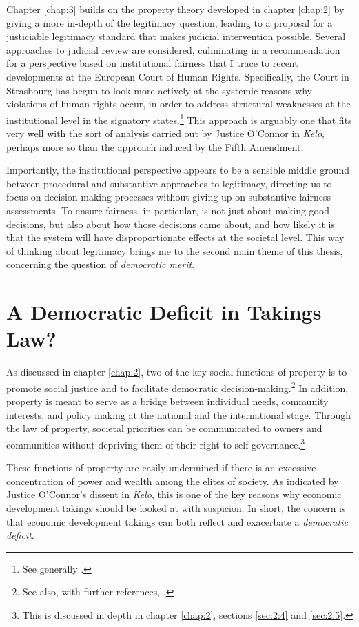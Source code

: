 Chapter \ref{chap:3} builds on the property theory developed in chapter \ref{chap:2} by giving a more in-depth of the legitimacy question, leading to a proposal for a justiciable legitimacy standard that makes judicial intervention possible. Several approaches to judicial review are considered, culminating in a recommendation for a perspective based on institutional fairness that I trace to recent developments at the European Court of Human Rights. Specifically, the Court in Strasbourg has begun to look more actively at the systemic reasons why violations of human rights occur, in order to address structural weaknesses at the institutional level in the signatory states.\footnote{See generally \cite{leach10}.} This approach is arguably one that fits very well with the sort of analysis carried out by Justice O'Connor in {\it Kelo}, perhaps more so than the approach induced by the Fifth Amendment.

Importantly, the institutional perspective appears to be a sensible middle ground between procedural and substantive approaches to legitimacy, directing us to focus on decision-making processes without giving up on substantive fairness assessments. To ensure fairness, in particular, is not just about making good decisions, but also about how those decisions came about, and how likely it is that the system will have disproportionate effects at the societal level. This way of thinking about legitimacy brings me to the second main theme of this thesis, concerning the question of {\it democratic merit}.

\section{A Democratic Deficit in Takings Law?}\label{sec:1:2}

As discussed in chapter \ref{chap:2}, two of the key social functions of property is to promote social justice and to facilitate democratic decision-making.\footnote{See also, with further references, \cite{rose96,jackson10}.} In addition, property is meant to serve as a bridge between individual needs, community interests, and policy making at the national and the international stage. Through the law of property, societal priorities can be communicated to owners and communities without depriving them of their right to self-governance.\footnote{This is discussed in depth in chapter \ref{chap:2}, sections \ref{sec:2:4} and \ref{sec:2:5}.}

These functions of property are easily undermined if there is an excessive concentration of power and wealth among the elites of society. As indicated by Justice O'Connor's dissent in {\it Kelo}, this is one of the key reasons why economic development takings should be looked at with suspicion. In short, the concern is that economic development takings can both reflect and exacerbate a {\it democratic deficit}.

